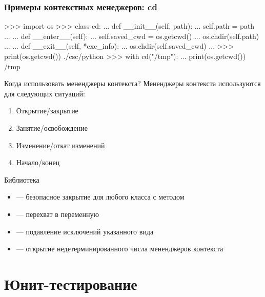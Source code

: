 \documentclass[fleqn, xcolor=x11names]{beamer}
\begin{document}
\begin{frame}[fragile]\frametitle{Примеры контекстных менеджеров: cd}
\begin{pcode}
>>> import os
>>> class cd:
...     def __init__(self, path):
...         self.path = path
...
...     def __enter__(self):
...         self.saved_cwd = os.getcwd()
...         os.chdir(self.path)
...
...     def __exit__(self, *exc_info):
...         os.chdir(self.saved_cwd)
...
>>> print(os.getcwd())
./csc/python
>>> with cd("/tmp"):
...     print(os.getcwd())
/tmp
\end{pcode}
\end{frame}

\begin{frame}{Когда использовать мененджеры контекста?}
Мененджеры контекста используются для следующих ситуаций:
\begin{enumerate}
    \item Открытие/закрытие 
    \item Занятие/освобождение 
    \item Изменение/откат изменений
    \item Начало/конец
\end{enumerate}
\end{frame}

\begin{frame}{Библиотека }
\begin{itemize}
    \item {} --- безопасное закрытие для любого класса с методом 
    
    \item {} --- перехват  в переменную
    
    \item {} --- подавление исключений указанного вида
    
    \item {} --- открытие недетерминированного числа мененджеров контекста
\end{itemize}

\end{frame}

\section{Юнит-тестирование}
\subsection*{}
\end{document}
